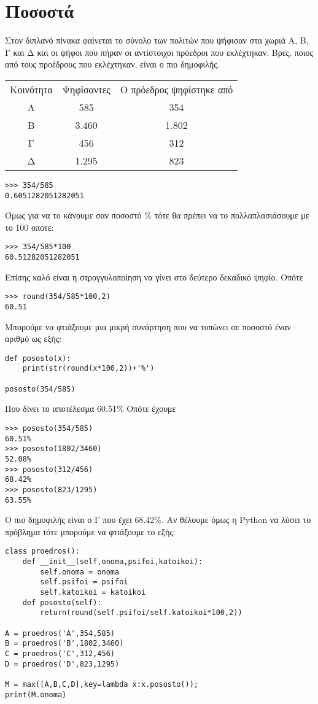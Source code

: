 \chapter{Ποσοστά}
Στον διπλανό πίνακα φαίνεται το σύνολο των
πολιτών που ψήφισαν στα χωριά
Α, Β, Γ και Δ και οι ψήφοι που πήραν οι
αντίστοιχοι πρόεδροι που εκλέχτηκαν.
Βρες, ποιος από τους προέδρους που
εκλέχτηκαν, είναι ο πιο δημοφιλής.

\begin{tabular}{ccc}
Κοινότητα & Ψηφίσαντες & Ο πρόεδρος ψηφίστηκε από\\
A& 585& 354\\
B& 3.460& 1.802\\
Γ& 456&312\\
Δ&1.295&823\\
\end{tabular}   

\begin{lstlisting}
>>> 354/585
0.6051282051282051
\end{lstlisting}
Όμως για να το κάνουμε σαν ποσοστό \% τότε θα πρέπει να το πολλαπλασιάσουμε με το 100 οπότε:
\begin{lstlisting}
>>> 354/585*100
60.51282051282051
\end{lstlisting}
Επίσης καλό είναι η στρογγυλοποίηση να γίνει στο δεύτερο δεκαδικό ψηφίο. Οπότε 
\begin{lstlisting}
>>> round(354/585*100,2)
60.51
\end{lstlisting}
Μπορούμε να φτιάξουμε μια μικρή συνάρτηση που να τυπώνει σε ποσοστό έναν αριθμό ως εξής:
\begin{lstlisting}
def pososto(x):
    print(str(round(x*100,2))+'%')

pososto(354/585)
\end{lstlisting}

Που  δίνει το αποτέλεσμα 60.51\%
Οπότε έχουμε
\begin{lstlisting}
>>> pososto(354/585)
60.51%
>>> pososto(1802/3460)
52.08%
>>> pososto(312/456)
68.42%
>>> pososto(823/1295)
63.55%
\end{lstlisting}

Ο πιο δημοφιλής είναι ο Γ που έχει 68.42\%.
Αν θέλουμε όμως η Python να λύσει το πρόβλημα τότε μπορούμε να φτιάξουμε το εξής:
\begin{lstlisting}
class proedros():
    def __init__(self,onoma,psifoi,katoikoi):
        self.onoma = onoma
        self.psifoi = psifoi
        self.katoikoi = katoikoi
    def pososto(self):
        return(round(self.psifoi/self.katoikoi*100,2))

A = proedros('A',354,585)
B = proedros('B',1802,3460)
C = proedros('C',312,456)
D = proedros('D',823,1295)

M = max([A,B,C,D],key=lambda x:x.pososto());
print(M.onoma)
\end{lstlisting}

